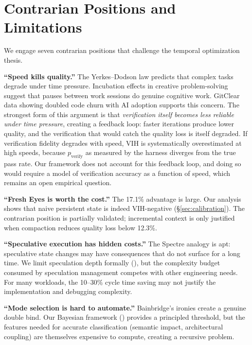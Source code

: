 \documentclass[11pt, a4paper, copyright]{googledeepmind}
\begin{document}
\section{Contrarian Positions and Limitations}\label{sec:contrarian}

We engage seven contrarian positions that challenge the temporal optimization thesis.

\textbf{``Speed kills quality.''} The Yerkes--Dodson law \citep{yerkes1908relation} predicts that complex tasks degrade under time pressure. Incubation effects in creative problem-solving \citep{sio2009incubation, wallas1926art} suggest that pauses between work sessions do genuine cognitive work. GitClear data showing doubled code churn with AI adoption \citep{gitclear2025} supports this concern. The strongest form of this argument is that \emph{verification itself becomes less reliable under time pressure}, creating a feedback loop: faster iterations produce lower quality, and the verification that would catch the quality loss is itself degraded. If verification fidelity degrades with speed, VIH is systematically overestimated at high speeds, because $p_{\mathrm{verify}}$ as measured by the harness diverges from the true pass rate. Our framework does not account for this feedback loop, and doing so would require a model of verification accuracy as a function of speed, which remains an open empirical question.

\textbf{``Fresh Eyes is worth the cost.''} The 17.1\% advantage is large. Our analysis shows that naive persistent state is indeed VIH-negative (\S\ref{sec:calibration}). The contrarian position is partially validated; incremental context is only justified when compaction reduces quality loss below 12.3\%.

\textbf{``Speculative execution has hidden costs.''} The Spectre analogy \citep{spectre2018} is apt: speculative state changes may have consequences that do not surface for a long time. We limit speculation depth formally (), but the complexity budget consumed by speculation management competes with other engineering needs. For many workloads, the 10--30\% cycle time saving may not justify the implementation and debugging complexity.

\textbf{``Mode selection is hard to automate.''} Bainbridge's ironies \citep{bainbridge1983ironies} create a genuine double bind. Our Bayesian framework () provides a principled threshold, but the features needed for accurate classification (semantic impact, architectural coupling) are themselves expensive to compute, creating a recursive problem.
\end{document}
